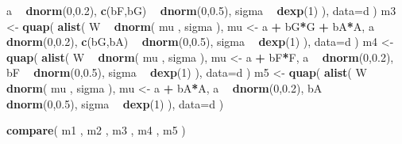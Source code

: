 \documentclass[
]{article}
\newenvironment{Shaded}{\begin{snugshade}}{\end{snugshade}}
\newcommand{\DataTypeTok}[1]{\textcolor[rgb]{0.13,0.29,0.53}{#1}}
\newcommand{\DecValTok}[1]{\textcolor[rgb]{0.00,0.00,0.81}{#1}}
\newcommand{\FloatTok}[1]{\textcolor[rgb]{0.00,0.00,0.81}{#1}}
\newcommand{\KeywordTok}[1]{\textcolor[rgb]{0.13,0.29,0.53}{\textbf{#1}}}
\newcommand{\NormalTok}[1]{#1}
\newcommand{\OperatorTok}[1]{\textcolor[rgb]{0.81,0.36,0.00}{\textbf{#1}}}
\newcommand{\StringTok}[1]{\textcolor[rgb]{0.31,0.60,0.02}{#1}}
\begin{document}
\begin{Shaded}
\begin{Highlighting}[]
\NormalTok{        a }\OperatorTok{~}\StringTok{ }\KeywordTok{dnorm}\NormalTok{(}\DecValTok{0}\NormalTok{,}\FloatTok{0.2}\NormalTok{),}
        \KeywordTok{c}\NormalTok{(bF,bG) }\OperatorTok{~}\StringTok{ }\KeywordTok{dnorm}\NormalTok{(}\DecValTok{0}\NormalTok{,}\FloatTok{0.5}\NormalTok{),}
\NormalTok{        sigma }\OperatorTok{~}\StringTok{ }\KeywordTok{dexp}\NormalTok{(}\DecValTok{1}\NormalTok{)}
\NormalTok{    ), }\DataTypeTok{data=}\NormalTok{d )}
\NormalTok{m3 <-}\StringTok{ }\KeywordTok{quap}\NormalTok{(}
    \KeywordTok{alist}\NormalTok{(}
\NormalTok{        W }\OperatorTok{~}\StringTok{ }\KeywordTok{dnorm}\NormalTok{( mu , sigma ),}
\NormalTok{        mu <-}\StringTok{ }\NormalTok{a }\OperatorTok{+}\StringTok{ }\NormalTok{bG}\OperatorTok{*}\NormalTok{G }\OperatorTok{+}\StringTok{ }\NormalTok{bA}\OperatorTok{*}\NormalTok{A,}
\NormalTok{        a }\OperatorTok{~}\StringTok{ }\KeywordTok{dnorm}\NormalTok{(}\DecValTok{0}\NormalTok{,}\FloatTok{0.2}\NormalTok{),}
        \KeywordTok{c}\NormalTok{(bG,bA) }\OperatorTok{~}\StringTok{ }\KeywordTok{dnorm}\NormalTok{(}\DecValTok{0}\NormalTok{,}\FloatTok{0.5}\NormalTok{),}
\NormalTok{        sigma }\OperatorTok{~}\StringTok{ }\KeywordTok{dexp}\NormalTok{(}\DecValTok{1}\NormalTok{)}
\NormalTok{    ), }\DataTypeTok{data=}\NormalTok{d )}
\NormalTok{m4 <-}\StringTok{ }\KeywordTok{quap}\NormalTok{(}
    \KeywordTok{alist}\NormalTok{(}
\NormalTok{        W }\OperatorTok{~}\StringTok{ }\KeywordTok{dnorm}\NormalTok{( mu , sigma ),}
\NormalTok{        mu <-}\StringTok{ }\NormalTok{a }\OperatorTok{+}\StringTok{ }\NormalTok{bF}\OperatorTok{*}\NormalTok{F,}
\NormalTok{        a }\OperatorTok{~}\StringTok{ }\KeywordTok{dnorm}\NormalTok{(}\DecValTok{0}\NormalTok{,}\FloatTok{0.2}\NormalTok{),}
\NormalTok{        bF }\OperatorTok{~}\StringTok{ }\KeywordTok{dnorm}\NormalTok{(}\DecValTok{0}\NormalTok{,}\FloatTok{0.5}\NormalTok{),}
\NormalTok{        sigma }\OperatorTok{~}\StringTok{ }\KeywordTok{dexp}\NormalTok{(}\DecValTok{1}\NormalTok{)}
\NormalTok{    ), }\DataTypeTok{data=}\NormalTok{d )}
\NormalTok{m5 <-}\StringTok{ }\KeywordTok{quap}\NormalTok{(}
    \KeywordTok{alist}\NormalTok{(}
\NormalTok{        W }\OperatorTok{~}\StringTok{ }\KeywordTok{dnorm}\NormalTok{( mu , sigma ),}
\NormalTok{        mu <-}\StringTok{ }\NormalTok{a }\OperatorTok{+}\StringTok{ }\NormalTok{bA}\OperatorTok{*}\NormalTok{A,}
\NormalTok{        a }\OperatorTok{~}\StringTok{ }\KeywordTok{dnorm}\NormalTok{(}\DecValTok{0}\NormalTok{,}\FloatTok{0.2}\NormalTok{),}
\NormalTok{        bA }\OperatorTok{~}\StringTok{ }\KeywordTok{dnorm}\NormalTok{(}\DecValTok{0}\NormalTok{,}\FloatTok{0.5}\NormalTok{),}
\NormalTok{        sigma }\OperatorTok{~}\StringTok{ }\KeywordTok{dexp}\NormalTok{(}\DecValTok{1}\NormalTok{)}
\NormalTok{), }\DataTypeTok{data=}\NormalTok{d )}


 \KeywordTok{compare}\NormalTok{( m1 , m2 , m3 , m4 , m5 )}
\end{Highlighting}
\end{Shaded}
\end{document}
